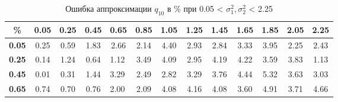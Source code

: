 \documentclass[12pt]{article}
\begin{document}
\begin{table}[]
	\caption{Ошибка аппроксимации $q_{10}$ в \% при 0.05 < $\sigma_{1}^{2}, \sigma_{2}^{2}$ < 2.25 }
	\begin{tabular}{|c|ccclcccccccc}
		\hline
		\textbf{\%}                         & \multicolumn{1}{c|}{\textbf{0.05}} & \multicolumn{1}{c|}{\textbf{0.25}} & \multicolumn{1}{c|}{\textbf{0.45}} & \multicolumn{1}{l|}{\textbf{0.65}} & \multicolumn{1}{c|}{\textbf{0.85}} & \multicolumn{1}{c|}{\textbf{1.05}} & \multicolumn{1}{c|}{\textbf{1.25}} & \multicolumn{1}{c|}{\textbf{1.45}} & \multicolumn{1}{c|}{\textbf{1.65}} & \multicolumn{1}{c|}{\textbf{1.85}} & \multicolumn{1}{c|}{\textbf{2.05}} & \multicolumn{1}{c|}{\textbf{2.25}} \\ \hline
		\textbf{0.05}                       & 0.25                               & 0.59                               & 1.83                               & \multicolumn{1}{c}{2.66}           & 2.14                               & 4.40                               & 2.93                               & 2.84                               & 3.33                               & 3.95                               & 2.25                               & 2.43                               \\ \cline{1-1}
		\textbf{0.25}                       & 0.14                               & 1.24                               & 0.64                               & 1.12                               & 3.49                               & 4.09                               & 2.95                               & 4.19                               & 4.22                               & 3.59                               & 3.83                               & 1.13                               \\ \cline{1-1}
		\textbf{0.45}                       & 0.01                               & 0.31                               & 1.44                               & 3.29                               & 2.49                               & 2.82                               & 3.29                               & 3.76                               & 4.44                               & 5.32                               & 3.63                               & 3.03                               \\ \cline{1-1}
		\textbf{0.65}                       & 0.74                               & 0.70                               & 0.76                               & 2.00                               & 2.09                               & 4.08                               & 4.16                               & 4.08                               & 3.60                               & 4.91                               & 3.71                               & 4.66                               \\ \cline{1-1}

\end{tabular}
\end{table}
\end{document}
